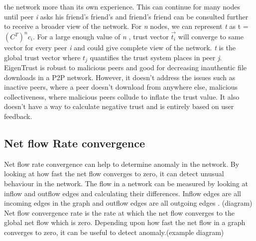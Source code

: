 the network more than its own experience. This can continue for many nodes until peer 
\textit{i} asks his friend's friend's and friend's friend can be consulted further to 
receive a broader view of the network. For \textit{n} nodes, we can represent \textit{t}
as t = $(C^T)^n c_{i}$. For a large enough value of \textit{n} , trust vector 
$\vec{t_{i}}$ will converge to same vector for every peer \textit{i} and could give 
complete view of the network. 
\textit{t} is the global trust vector where $t_{j}$ quantifies the trust system places in 
peer \textit{j}. 
EigenTrust is robust to malicious peers and good for decreasing inauthentic file downloads 
in a P2P network. However, it doesn't address the issues such as inactive peers, where a 
peer doesn't download from anywhere else, malicious collectiveness, where malicious peers 
collude to inflate the trust value. It also doesn't have a way to calculate negative trust 
and is entirely based on user feedback. \cite{kamvar2003eigentrust}



\subsection{Net flow Rate convergence}
Net flow rate convergence can help to determine anomaly in the network. By looking at how 
fast the net flow converges to zero, it can detect unusual behaviour in the network. 
The flow in a network can be measured by looking at inflow and outflow edges and 
calculating their differences. Inflow edges are all incoming edges in the graph and 
outflow edges are all outgoing edges . (diagram) Net flow convergence rate is the rate at which the net flow converges to the global net flow which is zero. 
Depending upon how fast the net flow in a graph converges to zero, it can be useful to 
detect anomaly.(example diagram) 



